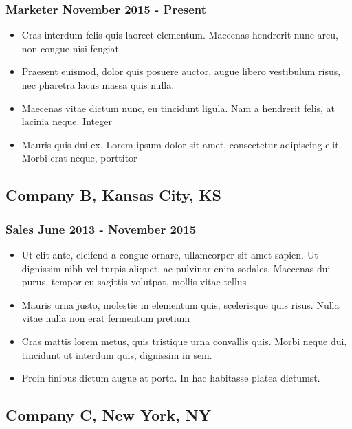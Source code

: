 \documentclass[a4paper]{article}
\begin{document}
\subsubsection{Marketer \hfill November 2015 - Present}
  \begin{itemize}
    \item Cras interdum felis quis laoreet elementum. Maecenas hendrerit nunc arcu, non congue nisi feugiat
    \item Praesent euismod, dolor quis posuere auctor, augue libero vestibulum risus, nec pharetra lacus massa quis nulla.
    \item Maecenas vitae dictum nunc, eu tincidunt ligula. Nam a hendrerit felis, at lacinia neque. Integer 
    \item Mauris quis dui ex. Lorem ipsum dolor sit amet, consectetur adipiscing elit. Morbi erat neque, porttitor
  \end{itemize}

\subsection{Company B, \textnormal{Kansas City, KS}}
\subsubsection{Sales \hfill June 2013 - November 2015}
  \begin{itemize}
    \item Ut elit ante, eleifend a congue ornare, ullamcorper sit amet sapien. Ut dignissim nibh vel turpis aliquet, ac pulvinar enim sodales. Maecenas dui purus, tempor eu sagittis volutpat, mollis vitae tellus
    \item Mauris urna justo, molestie in elementum quis, scelerisque quis risus. Nulla vitae nulla non erat fermentum pretium
    \item Cras mattis lorem metus, quis tristique urna convallis quis. Morbi neque dui, tincidunt ut interdum quis, dignissim in sem.
    \item Proin finibus dictum augue at porta. In hac habitasse platea dictumst.


  \end{itemize}

\subsection{Company C, \textnormal{New York, NY}}
\end{document}
